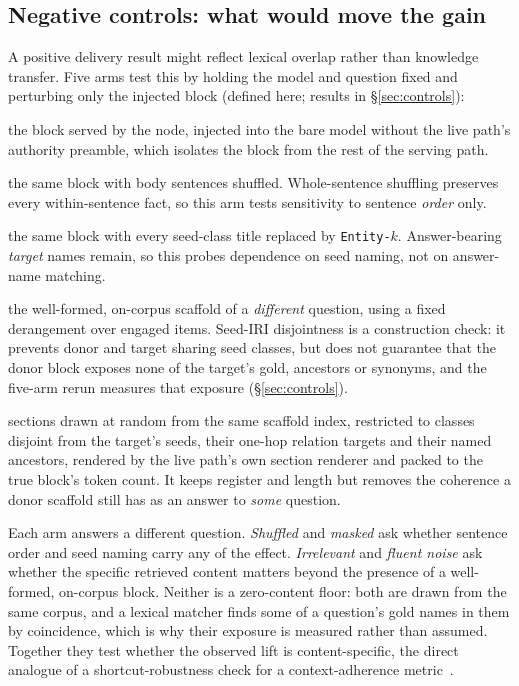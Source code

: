 \documentclass[10pt,twocolumn]{article}
\begin{document}
\subsection{Negative controls: what would move the gain}\label{sec:ceiling-controls}
A positive delivery result might reflect lexical overlap rather than knowledge transfer. Five arms test this by holding the model and question fixed and perturbing only the injected block (defined here; results in \S\ref{sec:controls}):
\begin{description}[topsep=2pt,itemsep=1pt,leftmargin=0pt,font=\normalfont\itshape]
\item[true] the block served by the node, injected into the bare model without the live path's authority preamble, which isolates the block from the rest of the serving path.
\item[shuffled] the same block with body sentences shuffled. Whole-sentence shuffling preserves every within-sentence fact, so this arm tests sensitivity to sentence \emph{order} only.
\item[masked] the same block with every seed-class title replaced by \texttt{Entity-$k$}. Answer-bearing \emph{target} names remain, so this probes dependence on seed naming, not on answer-name matching.
\item[irrelevant] the well-formed, on-corpus scaffold of a \emph{different} question, using a fixed derangement over engaged items. Seed-IRI disjointness is a construction check: it prevents donor and target sharing seed classes, but does not guarantee that the donor block exposes none of the target's gold, ancestors or synonyms, and the five-arm rerun measures that exposure (\S\ref{sec:controls}).
\item[fluent noise] sections drawn at random from the same scaffold index, restricted to classes disjoint from the target's seeds, their one-hop relation targets and their named ancestors, rendered by the live path's own section renderer and packed to the true block's token count. It keeps register and length but removes the coherence a donor scaffold still has as an answer to \emph{some} question.
\end{description}
Each arm answers a different question. \emph{Shuffled} and \emph{masked} ask whether sentence order and seed naming carry any of the effect. \emph{Irrelevant} and \emph{fluent noise} ask whether the specific retrieved content matters beyond the presence of a well-formed, on-corpus block. Neither is a zero-content floor: both are drawn from the same corpus, and a lexical matcher finds some of a question's gold names in them by coincidence, which is why their exposure is measured rather than assumed. Together they test whether the observed lift is content-specific, the direct analogue of a shortcut-robustness check for a context-adherence metric~\cite{gao2023alce}.
\end{document}
